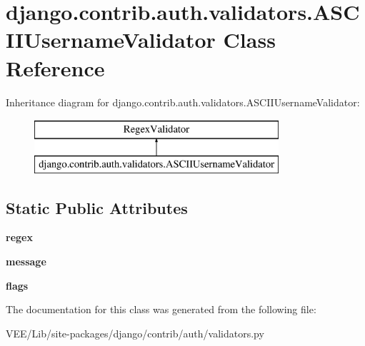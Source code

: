 \hypertarget{classdjango_1_1contrib_1_1auth_1_1validators_1_1_a_s_c_i_i_username_validator}{}\section{django.\+contrib.\+auth.\+validators.\+A\+S\+C\+I\+I\+Username\+Validator Class Reference}
\label{classdjango_1_1contrib_1_1auth_1_1validators_1_1_a_s_c_i_i_username_validator}
Inheritance diagram for django.\+contrib.\+auth.\+validators.\+A\+S\+C\+I\+I\+Username\+Validator\+:\begin{figure}[H]
\begin{center}
\leavevmode
\includegraphics[height=2.000000cm]{classdjango_1_1contrib_1_1auth_1_1validators_1_1_a_s_c_i_i_username_validator}
\end{center}
\end{figure}
\subsection*{Static Public Attributes}
\begin{DoxyCompactItemize}
\item 
\mbox{\label{classdjango_1_1contrib_1_1auth_1_1validators_1_1_a_s_c_i_i_username_validator_ae1cc9954a3fcf0c2b33557efa600aa37}} 
{\bfseries regex}
\item 
\mbox{\label{classdjango_1_1contrib_1_1auth_1_1validators_1_1_a_s_c_i_i_username_validator_a36a6ab164f2c2b34fa1cc8b6bdfbce20}} 
{\bfseries message}
\item 
\mbox{\label{classdjango_1_1contrib_1_1auth_1_1validators_1_1_a_s_c_i_i_username_validator_a18de44a6b4e44fe69f421391a70988af}} 
{\bfseries flags}
\end{DoxyCompactItemize}


The documentation for this class was generated from the following file\+:\begin{DoxyCompactItemize}
\item 
V\+E\+E/\+Lib/site-\/packages/django/contrib/auth/validators.\+py\end{DoxyCompactItemize}
